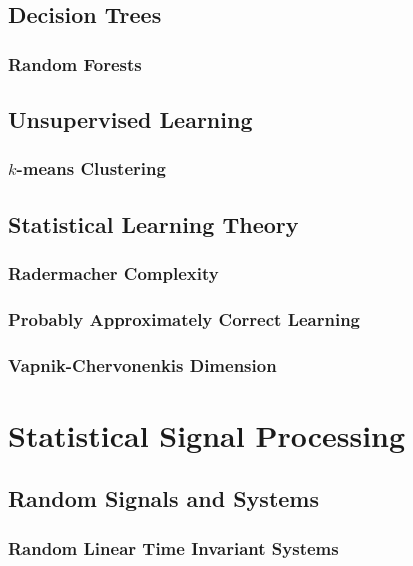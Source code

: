 \documentclass[11pt]{report} %
\begin{document}
\section{Decision Trees}

\subsection{Random Forests}

\section{Unsupervised Learning}

\subsection{$k$-means Clustering}

\section{Statistical Learning Theory}

\subsection{Radermacher Complexity}

\subsection{Probably Approximately Correct Learning}

\subsection{Vapnik-Chervonenkis Dimension}

\chapter{Statistical Signal Processing}

\section{Random Signals and Systems}

\subsection{Random Linear Time Invariant Systems}
\end{document}
